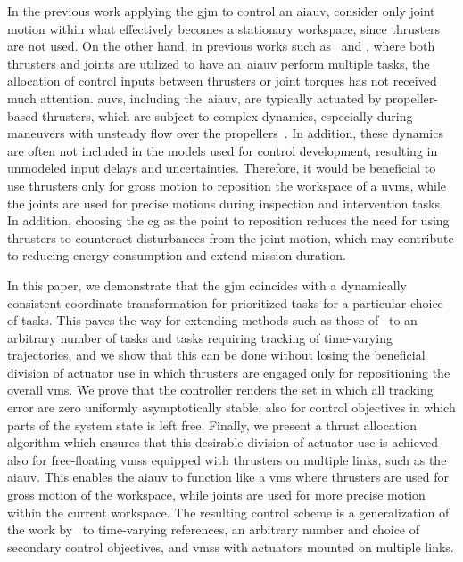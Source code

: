 \documentclass[../main.tex]{subfiles}
\begin{document}

In the previous work applying the \gls{gjm} to control an \gls{aiauv}, \cite{Amundsen2018} consider only joint motion within what effectively becomes a stationary workspace, since thrusters are not used. On the other hand, in previous works such as~\cite{Saeboe2022} and \cite{DyrhaugTveter2023}, where both thrusters and joints are utilized to have an~\gls{aiauv} perform multiple tasks, the allocation of control inputs between thrusters or joint torques has not received much attention. \Glspl{auv}, including the~\gls{aiauv}, are typically actuated by propeller-based thrusters, which are subject to complex dynamics, especially during maneuvers with unsteady flow over the propellers~\citep{Healey1995}. In addition, these dynamics are often not included in the models used for control development, resulting in unmodeled input delays and uncertainties. Therefore, it would be beneficial to use thrusters only for gross motion to reposition the workspace of a \gls{uvms}, while the joints are used for precise motions during inspection and intervention tasks. In addition, choosing the \gls{cg} as the point to reposition reduces the need for using thrusters to counteract disturbances from the joint motion, which may contribute to reducing energy consumption and extend mission duration.




In this paper, we demonstrate that the \gls{gjm} coincides with a dynamically consistent coordinate transformation for prioritized tasks for a particular choice of tasks. This paves the way for extending methods such as those of~\cite{Giordano2018} to an arbitrary number of tasks and tasks requiring tracking of time-varying trajectories, and we show that this can be done without losing the beneficial division of actuator use in which thrusters are engaged only for repositioning the overall \gls{vms}. We prove that the controller renders the set in which all tracking error are zero uniformly asymptotically stable, also for control objectives in which parts of the system state is left free. Finally, we present a thrust allocation algorithm which ensures that this desirable division of actuator use is achieved also for free-floating \glspl{vms} equipped with thrusters on multiple links, such as the \gls{aiauv}. This enables the \gls{aiauv} to function like a \gls{vms} where thrusters are used for gross motion of the workspace, while joints are used for more precise motion within the current workspace. The resulting control scheme is a generalization of the work by~\cite{Giordano2018} to time-varying references, an arbitrary number and choice of secondary control objectives, and \glspl{vms} with actuators mounted on multiple links. %
\end{document}
